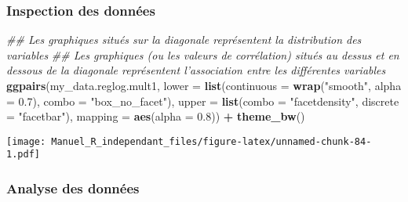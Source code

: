 \documentclass[
]{book}
\newenvironment{Shaded}{\begin{snugshade}}{\end{snugshade}}
\newcommand{\CommentTok}[1]{\textcolor[rgb]{0.56,0.35,0.01}{\textit{#1}}}
\newcommand{\DataTypeTok}[1]{\textcolor[rgb]{0.13,0.29,0.53}{#1}}
\newcommand{\FloatTok}[1]{\textcolor[rgb]{0.00,0.00,0.81}{#1}}
\newcommand{\KeywordTok}[1]{\textcolor[rgb]{0.13,0.29,0.53}{\textbf{#1}}}
\newcommand{\NormalTok}[1]{#1}
\newcommand{\OperatorTok}[1]{\textcolor[rgb]{0.81,0.36,0.00}{\textbf{#1}}}
\newcommand{\StringTok}[1]{\textcolor[rgb]{0.31,0.60,0.02}{#1}}
\begin{document}
\begin{Shaded}
\end{Shaded}

\hypertarget{inspection-des-donnuxe9es-8}{%
\subsubsection{Inspection des données}\label{inspection-des-donnuxe9es-8}}

\begin{Shaded}
\begin{Highlighting}[]
\CommentTok{## Les graphiques situés sur la diagonale représentent la distribution des variables}
\CommentTok{## Les graphiques (ou les valeurs de corrélation) situés au dessus et en dessous de la diagonale représentent l'association entre les différentes variables}
\KeywordTok{ggpairs}\NormalTok{(my_data.reglog.mult1,}
        \DataTypeTok{lower =} \KeywordTok{list}\NormalTok{(}\DataTypeTok{continuous =} \KeywordTok{wrap}\NormalTok{(}\StringTok{"smooth"}\NormalTok{, }\DataTypeTok{alpha =} \FloatTok{0.7}\NormalTok{), }\DataTypeTok{combo =} \StringTok{"box_no_facet"}\NormalTok{),}
        \DataTypeTok{upper =} \KeywordTok{list}\NormalTok{(}\DataTypeTok{combo =} \StringTok{"facetdensity"}\NormalTok{, }\DataTypeTok{discrete =} \StringTok{"facetbar"}\NormalTok{), }
        \DataTypeTok{mapping =} \KeywordTok{aes}\NormalTok{(}\DataTypeTok{alpha =} \FloatTok{0.8}\NormalTok{)) }\OperatorTok{+}\StringTok{ }\KeywordTok{theme_bw}\NormalTok{()}
\end{Highlighting}
\end{Shaded}

\texttt{[image: Manuel\_R\_independant\_files/figure-latex/unnamed-chunk-84-1.pdf]}

\hypertarget{analyse-des-donnuxe9es-9}{%
\subsubsection{Analyse des données}\label{analyse-des-donnuxe9es-9}}
\end{document}

